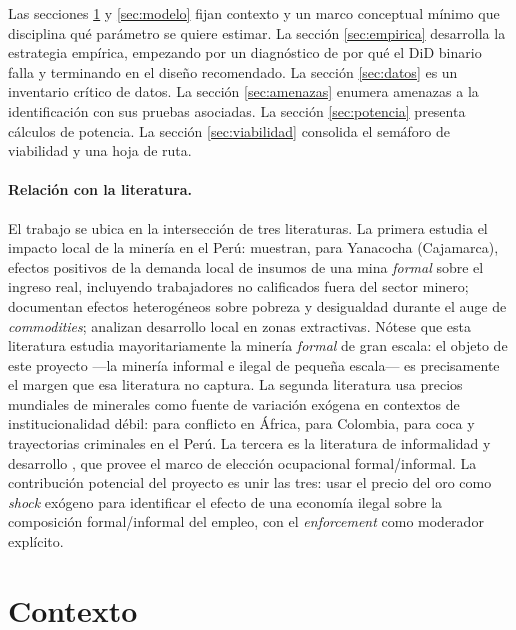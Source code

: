 \documentclass[11pt,a4paper]{article}
\begin{document}
Las secciones \ref{sec:contexto} y \ref{sec:modelo} fijan contexto y un marco conceptual mínimo que disciplina qué parámetro se quiere estimar. La sección \ref{sec:empirica} desarrolla la estrategia empírica, empezando por un diagnóstico de por qué el DiD binario falla y terminando en el diseño recomendado. La sección \ref{sec:datos} es un inventario crítico de datos. La sección \ref{sec:amenazas} enumera amenazas a la identificación con sus pruebas asociadas. La sección \ref{sec:potencia} presenta cálculos de potencia. La sección \ref{sec:viabilidad} consolida el semáforo de viabilidad y una hoja de ruta.

\paragraph{Relación con la literatura.} El trabajo se ubica en la intersección de tres literaturas. La primera estudia el impacto local de la minería en el Perú: \citet{aragon2013} muestran, para Yanacocha (Cajamarca), efectos positivos de la demanda local de insumos de una mina \emph{formal} sobre el ingreso real, incluyendo trabajadores no calificados fuera del sector minero; \citet{loayza2016} documentan efectos heterogéneos sobre pobreza y desigualdad durante el auge de \emph{commodities}; \citet{ticci2015} analizan desarrollo local en zonas extractivas. Nótese que esta literatura estudia mayoritariamente la minería \emph{formal} de gran escala: el objeto de este proyecto ---la minería informal e ilegal de pequeña escala--- es precisamente el margen que esa literatura no captura. La segunda literatura usa precios mundiales de minerales como fuente de variación exógena en contextos de institucionalidad débil: \citet{berman2017} para conflicto en África, \citet{dube2013} para Colombia, \citet{sviatschi2022} para coca y trayectorias criminales en el Perú. La tercera es la literatura de informalidad y desarrollo \citep{laporta2014,ulyssea2018}, que provee el marco de elección ocupacional formal/informal. La contribución potencial del proyecto es unir las tres: usar el precio del oro como \emph{shock} exógeno para identificar el efecto de una economía ilegal sobre la composición formal/informal del empleo, con el \emph{enforcement} como moderador explícito.

\section{Contexto}\label{sec:contexto}
\end{document}
